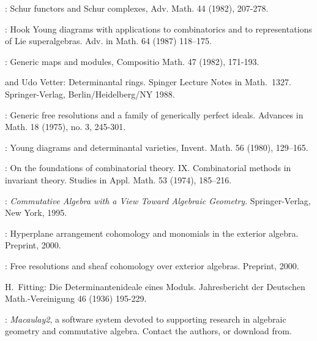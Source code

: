 \documentclass{tran-l}
\theoremstyle{plain}
\theoremstyle{remark}
\theoremstyle{definition}
\begin{document}

\begin{thebibliography}{ABW} 

: Schur functors and
Schur complexes, Adv. Math. 44 (1982), 207-278. 

: Hook Young diagrams with applications
to combinatorics and to representations of Lie superalgebras. Adv. in Math. 64
(1987) 118--175.

: Generic maps and modules, Compositio 
Math. 47 (1982), 171-193. 

 and Udo Vetter: Determinantal rings.  Spinger
Lecture Notes in Math.~1327. Springer-Verlag, Berlin/Heidelberg/NY 1988.

: Generic free
resolutions and a family of generically perfect
ideals. Advances in Math. 18  (1975), no. 3, 245-301. 

: Young
diagrams and determinantal varieties, Invent.
Math. 56  (1980), 129--165.  

:
On the foundations of combinatorial theory. IX.
Combinatorial methods in invariant theory.
Studies in Appl. Math. 53 (1974), 185--216. 

: {\em Commutative Algebra with a View Toward
Algebraic Geometry}. Springer-Verlag, New York, 1995. 

: Hyperplane
arrangement cohomology and monomials in the exterior algebra. Preprint, 2000.

: Free resolutions and
sheaf cohomology over exterior algebras. Preprint, 2000.

 {H.~Fitting}: Die Determinantenideale eines Moduls. Jahresbericht
der Deutschen Math.-Vereinigung 46 (1936) 195-229.

: {\em Macaulay2}, a
software system devoted to supporting research in algebraic geometry
and commutative algebra.  Contact 
the authors, or download 
from\hfill {}.


\end{thebibliography}
\end{document}
